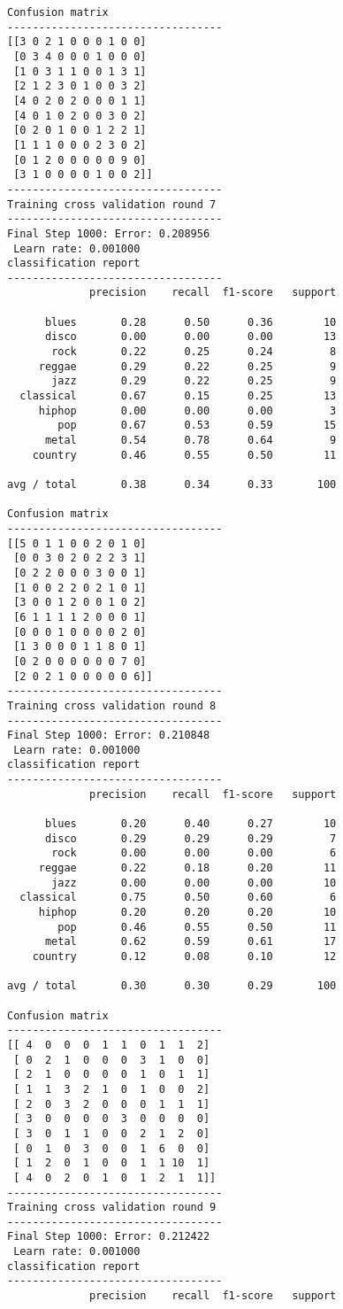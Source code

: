 \documentclass{article}
\begin{document}
\begin{Verbatim}[commandchars=\\\{\}]
Confusion matrix
----------------------------------
[[3 0 2 1 0 0 0 1 0 0]
 [0 3 4 0 0 0 1 0 0 0]
 [1 0 3 1 1 0 0 1 3 1]
 [2 1 2 3 0 1 0 0 3 2]
 [4 0 2 0 2 0 0 0 1 1]
 [4 0 1 0 2 0 0 3 0 2]
 [0 2 0 1 0 0 1 2 2 1]
 [1 1 1 0 0 0 2 3 0 2]
 [0 1 2 0 0 0 0 0 9 0]
 [3 1 0 0 0 0 1 0 0 2]]
----------------------------------
Training cross validation round 7
----------------------------------
Final Step 1000: Error: 0.208956 
 Learn rate: 0.001000
classification report 
----------------------------------
             precision    recall  f1-score   support

      blues       0.28      0.50      0.36        10
      disco       0.00      0.00      0.00        13
       rock       0.22      0.25      0.24         8
     reggae       0.29      0.22      0.25         9
       jazz       0.29      0.22      0.25         9
  classical       0.67      0.15      0.25        13
     hiphop       0.00      0.00      0.00         3
        pop       0.67      0.53      0.59        15
      metal       0.54      0.78      0.64         9
    country       0.46      0.55      0.50        11

avg / total       0.38      0.34      0.33       100

Confusion matrix
----------------------------------
[[5 0 1 1 0 0 2 0 1 0]
 [0 0 3 0 2 0 2 2 3 1]
 [0 2 2 0 0 0 3 0 0 1]
 [1 0 0 2 2 0 2 1 0 1]
 [3 0 0 1 2 0 0 1 0 2]
 [6 1 1 1 1 2 0 0 0 1]
 [0 0 0 1 0 0 0 0 2 0]
 [1 3 0 0 0 1 1 8 0 1]
 [0 2 0 0 0 0 0 0 7 0]
 [2 0 2 1 0 0 0 0 0 6]]
----------------------------------
Training cross validation round 8
----------------------------------
Final Step 1000: Error: 0.210848 
 Learn rate: 0.001000
classification report 
----------------------------------
             precision    recall  f1-score   support

      blues       0.20      0.40      0.27        10
      disco       0.29      0.29      0.29         7
       rock       0.00      0.00      0.00         6
     reggae       0.22      0.18      0.20        11
       jazz       0.00      0.00      0.00        10
  classical       0.75      0.50      0.60         6
     hiphop       0.20      0.20      0.20        10
        pop       0.46      0.55      0.50        11
      metal       0.62      0.59      0.61        17
    country       0.12      0.08      0.10        12

avg / total       0.30      0.30      0.29       100

Confusion matrix
----------------------------------
[[ 4  0  0  0  1  1  0  1  1  2]
 [ 0  2  1  0  0  0  3  1  0  0]
 [ 2  1  0  0  0  0  1  0  1  1]
 [ 1  1  3  2  1  0  1  0  0  2]
 [ 2  0  3  2  0  0  0  1  1  1]
 [ 3  0  0  0  0  3  0  0  0  0]
 [ 3  0  1  1  0  0  2  1  2  0]
 [ 0  1  0  3  0  0  1  6  0  0]
 [ 1  2  0  1  0  0  1  1 10  1]
 [ 4  0  2  0  1  0  1  2  1  1]]
----------------------------------
Training cross validation round 9
----------------------------------
Final Step 1000: Error: 0.212422 
 Learn rate: 0.001000
classification report 
----------------------------------
             precision    recall  f1-score   support


\end{Verbatim}
\end{document}
